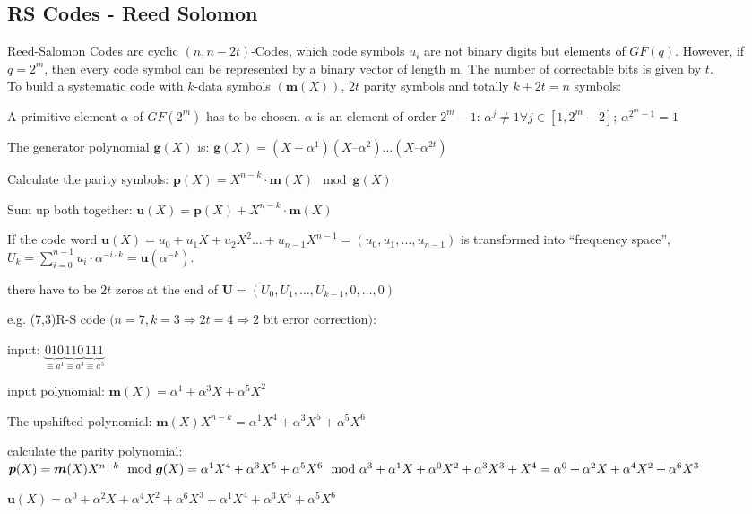 \subsection{RS Codes - Reed Solomon}%
Reed-Salomon Codes are cyclic $(n, n-2t)$-Codes, which code symbols $u_i$ are not binary digits but elements of $GF(q)$. However, if $q=2^m$, then every code symbol
can be represented by a binary vector of length m. The number of correctable bits is given by $t$.\\


To build a systematic code with $k$-data symbols $(\bm m(X))$, $2t$ parity symbols and totally $k+2t=n$ symbols:
\begin{liste}
\item A primitive element $\alpha$ of $GF(2^m)$ has to be chosen. 
$\alpha$ is an element of order $2^m-1$: $\alpha^j\neq 1 \forall j\in [1,2^m-2]$; $\alpha^{2^m-1}=1$
\item The generator polynomial $\bm g(X)$ is:  $\bm g(X)=(X - \alpha^1) (X – \alpha^2)\ldots (X – \alpha^{2t})$
\item Calculate the parity symbols: $\bm p(X)=X^{n-k}\cdot \bm m(X) \mod \bm g(X)$
\item Sum up both together: $\bm u(X)=\bm p(X) +X^{n-k}\cdot \bm m(X) $
\item If the code word $\bm u(X) = u_0 + u_1 X+u_2 X^2\ldots+u_{n-1}X^{n-1} = ( u_0,  u_1, \ldots,  u_{n-1})$ is transformed into ``frequency space'', 
$U_k = \sum\limits_{i=0}^{n-1} u_i\cdot \alpha^{-i\cdot k}=\bm u(\alpha^{-k})$.
\item there have to be $2t$ zeros at the end of $\bm U=(U_0,U_1,\ldots,U_{k-1},0,\ldots,0)$
\end{liste}
e.g. (7,3)R-S code $(n=7, k=3 \Rightarrow 2t=4 \Rightarrow 2$ bit error correction$)$:
\begin{liste}
\item input: $\underbrace{010}_{\equiv a^1} \underbrace{110}_{\equiv a^3} \underbrace{111}_{\equiv a^5}$
\item input polynomial: $\bm m(X)=\alpha^1 + \alpha^3 X + \alpha^5 X^2$ 
\item The upshifted polynomial: $\bm m(X) X^{n-k}=\alpha^1 X^4 + \alpha^3 X^5 + \alpha^5 X^6$
\item calculate the parity polynomial: $\bm p(X)=\bm m(X) X^{n-k} \mod \bm g(X)\\
= \alpha^1 X^4 + \alpha^3 X^5 + \alpha^5 X^6 \mod \alpha^3 + \alpha^1 X + \alpha^0 X^2+\alpha^3 X^3+ X^4=\alpha^0+\alpha^2 X+\alpha^4 X^2 + \alpha^6 X^3$
\item $\bm u(X)=\alpha^0 + \alpha^2 X + \alpha^4 X^2 + \alpha^6 X^3+ \alpha^1 X^4 + \alpha^3 X^5 + \alpha^5 X^6$
\end{liste}

